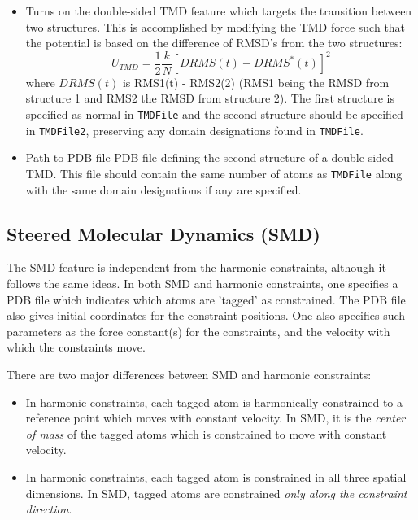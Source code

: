 \begin{itemize}
\item
{}
{Turns on the double-sided TMD feature which targets the transition between two structures. 
This is accomplished by modifying the TMD force such that the potential is based on the
difference of RMSD's from the two structures:
\begin{equation}
U_{TMD} = \frac{1}{2} \frac{k}{N} \left[ DRMS(t) - DRMS^*(t) \right]^2
\label{eq:tmdpotential}
\end{equation}
where $DRMS(t)$ is RMS1(t) - RMS2(2) (RMS1 being the RMSD from structure 1 and RMS2 the RMSD from structure 2).
The first structure is specified as normal in {\tt TMDFile} and the second structure should
be specified in {\tt TMDFile2}, preserving any domain designations found in {\tt TMDFile}. 
}

\item
{}
{Path to PDB file}
{PDB file defining the second structure of a double sided TMD. This file
should contain the same number of atoms as {\tt TMDFile} along with the 
same domain designations if any are specified.
}

\end{itemize}

\subsection{Steered Molecular Dynamics (SMD)}

The SMD feature is independent from the harmonic constraints, although it
follows the same ideas.  In both SMD and harmonic constraints, one specifies
a PDB file which indicates which atoms are 'tagged' as constrained.  The PDB
file also gives initial coordinates for the constraint positions.  One also
specifies such parameters as the force constant(s) for the constraints, 
and the velocity with which the constraints move.  

There are two major differences between SMD and
harmonic constraints:
\begin{itemize}
\item In harmonic constraints, each tagged atom is harmonically constrained
  to a reference point which moves with constant velocity.  In SMD, it is
  the {\em center of mass} of the tagged atoms which is constrained to move
  with constant velocity.

\item In harmonic constraints, each tagged atom is constrained in all three
  spatial dimensions.  In SMD, tagged atoms are constrained {\em only along
  the constraint direction}.
\end{itemize}

